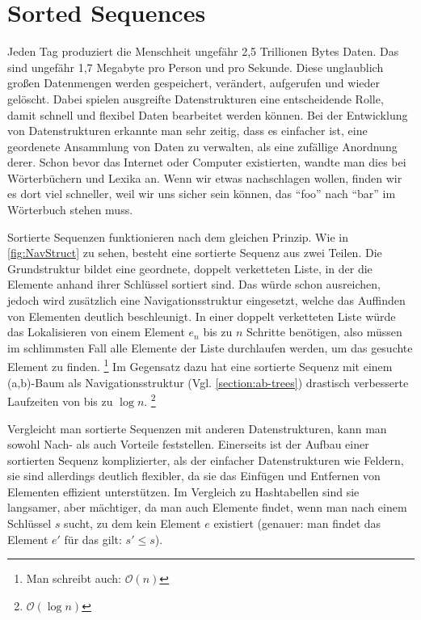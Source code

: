 
\chapter{Sorted Sequences}

Jeden Tag produziert die Menschheit ungefähr 2,5 Trillionen Bytes Daten. Das sind ungefähr 1,7 Megabyte pro Person und pro Sekunde.\cite{techjury:20} Diese unglaublich großen Datenmengen werden gespeichert, verändert, aufgerufen und wieder gelöscht. Dabei spielen ausgreifte Datenstrukturen eine entscheidende Rolle, damit schnell und flexibel Daten bearbeitet werden können. Bei der Entwicklung von Datenstrukturen erkannte man sehr zeitig, dass es einfacher ist, eine geordenete Ansammlung von Daten zu verwalten, als eine zufällige Anordnung derer. Schon bevor das Internet oder Computer existierten, wandte man dies bei Wörterbüchern und Lexika an. Wenn wir etwas nachschlagen wollen, finden wir es dort viel schneller, weil wir uns sicher sein können, das "`foo"' nach "`bar"' im Wörterbuch stehen muss.
\par
Sortierte Sequenzen funktionieren nach dem gleichen Prinzip. Wie in \autoref{fig:NavStruct} zu sehen, besteht eine sortierte Sequenz aus zwei Teilen. Die Grundstruktur bildet eine geordnete, doppelt verketteten Liste, in der die Elemente anhand ihrer Schlüssel sortiert sind. Das würde schon ausreichen, jedoch wird zusätzlich eine Navigationsstruktur eingesetzt, welche das Auffinden von Elementen deutlich beschleunigt. In einer doppelt verketteten Liste würde das Lokalisieren von einem Element $e_n$ bis zu $n$ Schritte benötigen, also müssen im schlimmsten Fall alle Elemente der Liste durchlaufen werden, um das gesuchte Element zu finden. \footnote{Man schreibt auch: $\mathcal{O} (n)$} Im Gegensatz dazu hat eine sortierte Sequenz mit einem (a,b)-Baum als Navigationsstruktur (Vgl. \autoref{section:ab-trees}) drastisch verbesserte Laufzeiten von bis zu $\log n$. \footnote{$\mathcal{O} (\log n)$} \cite{Sanders:19}
\par
Vergleicht man sortierte Sequenzen mit anderen Datenstrukturen, kann man sowohl Nach- als auch Vorteile feststellen. Einerseits ist der Aufbau einer sortierten Sequenz komplizierter, als der einfacher Datenstrukturen wie Feldern, sie sind allerdings deutlich flexibler, da sie das Einfügen und Entfernen von Elementen effizient unterstützen. Im Vergleich zu Hashtabellen sind sie langsamer, aber mächtiger, da man auch Elemente findet, wenn man nach einem Schlüssel $s$ sucht, zu dem kein Element $e$ existiert (genauer: man findet das Element $e'$ für das gilt: $s'\leq s$).
